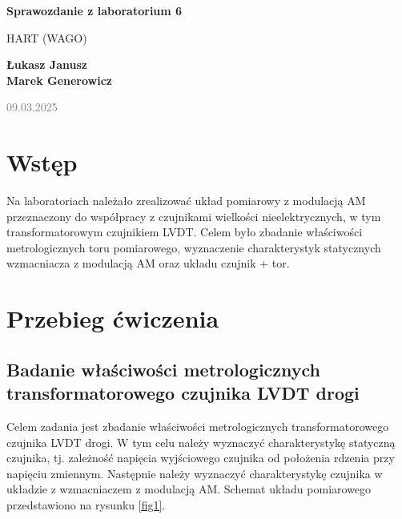 \documentclass{article}
\begin{document}
\begin{titlepage}
    \begin{center}
        \vspace*{1cm}
            
        \Huge
        \textbf{Sprawozdanie z laboratorium 6}
            
        \vspace{0.5cm}
        \LARGE
        HART (WAGO)
            
        \vspace{1.5cm}
            
        \textbf{Łukasz Janusz\\Marek Generowicz}

        \normalsize      
        \textcolor{gray}{09.03.2025}
        \vfill
            
        \vspace{0.8cm}
                        
            
    \end{center}
\end{titlepage}

\section{Wstęp}
Na laboratoriach należało zrealizować układ pomiarowy z modulacją AM przeznaczony do współpracy z czujnikami wielkości nieelektrycznych, w tym transformatorowym czujnikiem LVDT. Celem było zbadanie właściwości metrologicznych toru pomiarowego, wyznaczenie charakterystyk statycznych wzmacniacza z modulacją AM oraz układu czujnik + tor.

\section{Przebieg ćwiczenia}

\subsection{Badanie właściwości metrologicznych transformatorowego czujnika LVDT drogi}

Celem zadania jest zbadanie właściwości metrologicznych transformatorowego czujnika LVDT drogi. W tym celu należy wyznaczyć charakterystykę statyczną czujnika, tj. zależność napięcia wyjściowego czujnika od położenia rdzenia przy napięciu zmiennym. Następnie należy wyznaczyć charakterystykę czujnika w układzie z wzmacniaczem z modulacją AM. Schemat układu pomiarowego przedstawiono na rysunku \ref{fig1}.
\end{document}
